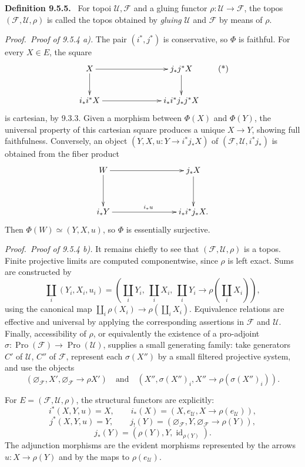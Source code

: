 \documentclass[11pt]{article}
\newcommand{\Uu}{\mathcal{U}}
\newcommand{\Ff}{\mathcal{F}}
\newcommand{\id}{\operatorname{id}}
\newcommand{\Pro}{\operatorname{Pro}}
\newenvironment{statement}[1]{\par\medskip\noindent\textbf{#1.}\ }{\par\medskip}
\newenvironment{prooftext}{\par\noindent\emph{Proof.}\ }{\par\medskip}
\begin{document}
\begin{statement}{Definition 9.5.5}
For topoi \(\Uu,\Ff\) and a gluing functor \(\rho:\Uu\to\Ff\), the topos \((\Ff,\Uu,\rho)\) is called the topos obtained by \emph{gluing} \(\Uu\) and \(\Ff\) by means of \(\rho\).
\end{statement}

\begin{prooftext}\emph{Proof of 9.5.4 a).} 
The pair \((i^*,j^*)\) is conservative, so \(\Phi\) is faithful. For every \(X\in E\), the square
\[
\xymatrix@C=2.5cm{
X\ar[r]\ar[d]&j_*j^*X\ar[d]\\
i_*i^*X\ar[r]&i_*i^*j_*j^*X
}
\tag{*}
\]
is cartesian, by 9.3.3. Given a morphism between \(\Phi(X)\) and \(\Phi(Y)\), the universal property of this cartesian square produces a unique \(X\to Y\), showing full faithfulness. Conversely, an object \((Y,X,u:Y\to i^*j_*X)\) of \((\Ff,\Uu,i^*j_*)\) is obtained from the fiber product
\[
\xymatrix@C=2.75cm@R=1.25cm{
W\ar[r]\ar[d]&j_*X\ar[d]\\
i_*Y\ar[r]^{i_*u}&i_*i^*j_*X.
}
\]
Then \(\Phi(W)\simeq(Y,X,u)\), so \(\Phi\) is essentially surjective.
\end{prooftext}

\begin{prooftext}\emph{Proof of 9.5.4 b).} 
It remains chiefly to see that \((\Ff,\Uu,\rho)\) is a topos. Finite projective limits are computed componentwise, since \(\rho\) is left exact. Sums are constructed by
\[
\coprod_i(Y_i,X_i,u_i)=
\left(\coprod_iY_i,\ \coprod_iX_i,\ \coprod_iY_i\to\rho(\coprod_iX_i)\right),
\]
using the canonical map \(\coprod_i\rho(X_i)\to\rho(\coprod_iX_i)\). Equivalence relations are effective and universal by applying the corresponding assertions in \(\Ff\) and \(\Uu\). Finally, accessibility of \(\rho\), or equivalently the existence of a pro-adjoint \(\sigma:\Pro(\Ff)\to\Pro(\Uu)\), supplies a small generating family: take generators \(C'\) of \(\Uu\), \(C''\) of \(\Ff\), represent each \(\sigma(X'')\) by a small filtered projective system, and use the objects
\[
(\varnothing_\Ff,X',\varnothing_\Ff\to\rho X')\quad\text{and}\quad
(X'',\sigma(X'')_i,X''\to\rho(\sigma(X'')_i)).
\]
\end{prooftext}

For \(E=(\Ff,\Uu,\rho)\), the structural functors are explicitly:
\[
i^*(X,Y,u)=X,\qquad
i_*(X)=(X,e_\Uu,X\to\rho(e_\Uu)),
\]
\[
j^*(X,Y,u)=Y,\qquad
j_!(Y)=(\varnothing_\Ff,Y,\varnothing_\Ff\to\rho(Y)),
\]
\[
j_*(Y)=(\rho(Y),Y,\id_{\rho(Y)}).
\]
The adjunction morphisms are the evident morphisms represented by the arrows \(u:X\to\rho(Y)\) and by the maps to \(\rho(e_\Uu)\).
\end{document}
